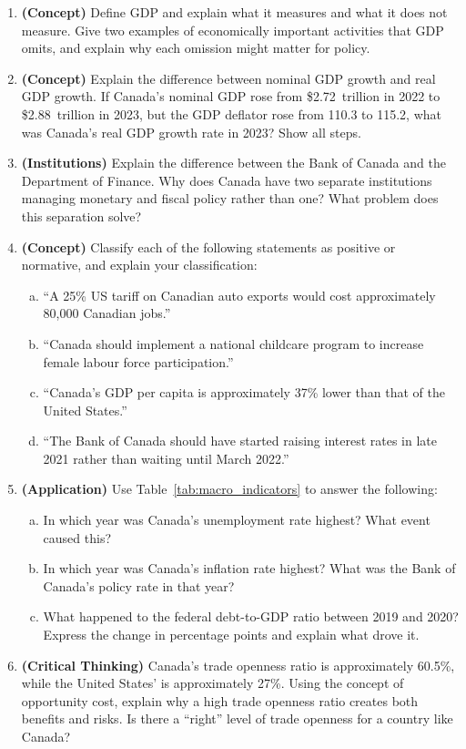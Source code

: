 \begin{enumerate}

\item \textbf{(Concept)} Define GDP and explain what it measures and what
it does not measure. Give two examples of economically important activities
that GDP omits, and explain why each omission might matter for policy.

\item \textbf{(Concept)} Explain the difference between nominal GDP growth
and real GDP growth. If Canada's nominal GDP rose from \$2.72~trillion
in 2022 to \$2.88~trillion in 2023, but the GDP deflator rose from
110.3 to 115.2, what was Canada's real GDP growth rate in 2023?
Show all steps.

\item \textbf{(Institutions)} Explain the difference between the Bank of
Canada and the Department of Finance. Why does Canada have two separate
institutions managing monetary and fiscal policy rather than one?
What problem does this separation solve?

\item \textbf{(Concept)} Classify each of the following statements as
positive or normative, and explain your classification:
\begin{enumerate}[(a)]
  \item ``A 25\% US tariff on Canadian auto exports would cost approximately
        80,000 Canadian jobs.''
  \item ``Canada should implement a national childcare program to increase
        female labour force participation.''
  \item ``Canada's GDP per capita is approximately 37\% lower than that
        of the United States.''
  \item ``The Bank of Canada should have started raising interest rates
        in late 2021 rather than waiting until March 2022.''
\end{enumerate}

\item \textbf{(Application)} Use Table~\ref{tab:macro_indicators} to
answer the following:
\begin{enumerate}[(a)]
  \item In which year was Canada's unemployment rate highest?
        What event caused this?
  \item In which year was Canada's inflation rate highest?
        What was the Bank of Canada's policy rate in that year?
  \item What happened to the federal debt-to-GDP ratio between 2019
        and 2020? Express the change in percentage points and explain
        what drove it.
\end{enumerate}

\item \textbf{(Critical Thinking)} Canada's trade openness ratio is
approximately 60.5\%, while the United States' is approximately 27\%.
Using the concept of opportunity cost, explain why a high trade openness
ratio creates both benefits and risks. Is there a ``right'' level of
trade openness for a country like Canada?

\end{enumerate}

